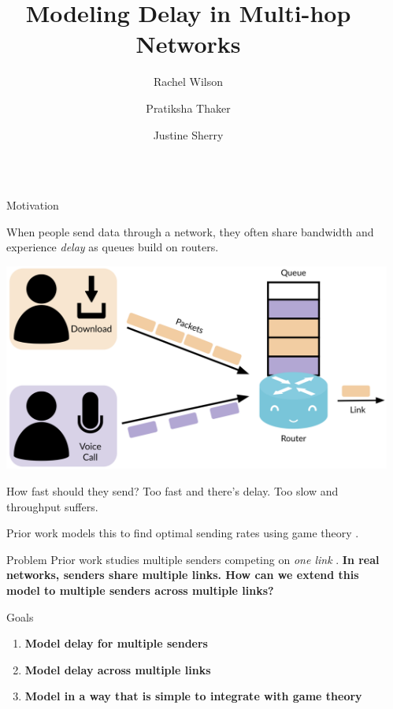 \documentclass[final]{beamer}
\title{Modeling Delay in Multi-hop Networks}
\author{Rachel Wilson \and Pratiksha Thaker \and Justine Sherry}
\institute[shortinst]{Carnegie Mellon University}
\newlength{\sepwidth}
\newlength{\colwidth}
\newcommand{\separatorcolumn}{\begin{column}{\sepwidth}\end{column}}
\begin{document}
\begin{frame}[t]
\begin{columns}[t]
\separatorcolumn

\begin{column}{\colwidth}

  \begin{exampleblock}{Motivation}

    When people send data through a network, they often share bandwidth
    and experience \textit{delay} as queues build on routers.

    \begin{center}
      \includegraphics{images/delaydiagram.png}
    \end{center}

    How fast should they send? Too fast and there's delay. Too slow and
    throughput suffers.

    Prior work models this to find optimal sending rates using game theory \cite{hotnets21}.
  \end{exampleblock}

  \begin{block}{Problem}
    \vspace{-5mm}
    Prior work studies multiple senders competing on \textit{one link} \cite{hotnets21}. 
    \textbf{In real networks, senders share multiple links. How can we
    extend this model to multiple senders across multiple links?}
  \end{block}
  \vspace{2mm}

  \begin{alertblock}{Goals}
    \vspace{2mm}
    \begin{enumerate}
      \item \textbf{Model delay for multiple senders}
      \item \textbf{Model delay across multiple links}
      \item \textbf{Model in a way that is simple to integrate with game theory}
    \end{enumerate}
  \end{alertblock}
  \vspace{2mm}


\end{column}
\end{columns}
\end{frame}
\end{document}
